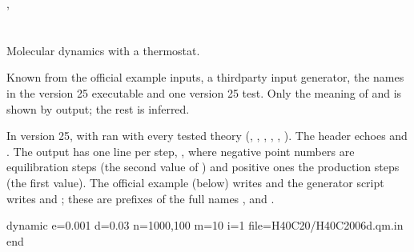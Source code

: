 \documentclass[letterpaper,10pt,english,openany,oneside]{sphinxmanual}
\begin{document}
\sphinxAtStartPar
{} {\hyperref[\detokenize{reference/Energy:energy-a}]{}}, {\hyperref[\detokenize{reference/Energy:energy-dx}]{}}

\sphinxstepscope




\section{}
\label{\detokenize{reference/dynamic:dynamic}}\label{\detokenize{reference/dynamic:group-dynamic}}\label{\detokenize{reference/dynamic::doc}}
\ignorespaces 
\sphinxAtStartPar
Molecular dynamics with a thermostat.

\sphinxAtStartPar
{} 

\sphinxAtStartPar
Known from the official example inputs, a third\sphinxhyphen{}party input generator, the names in the version 25 executable
and one version 25 test. Only the meaning of  and  is shown by output; the rest is inferred.

\sphinxAtStartPar
In version 25,  with  ran with every tested theory (,
, , , , ). The header echoes  and
. The output has one line per step, , where
negative point numbers are equilibration steps (the second value of ) and positive ones the production steps
(the first value). The official example (below) writes  and the generator script writes  and ;
these are prefixes of the full names ,  and .

\begin{sphinxVerbatim}[commandchars=\\\{\}]
\PYGZdl{}dynamic
 e=0.001
 d=0.03
 n=1000,100
 m=10
 i=1
 file=H40C20/H40C20\PYGZus{}\PYGZpc{}06d.qm.in
\PYGZdl{}end
\end{sphinxVerbatim}
\end{document}
